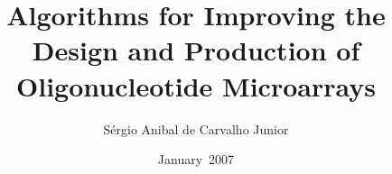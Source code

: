 \documentclass[12pt,pagesize,a4paper,BCOR1cm,DIV13,headsepline,cleardoubleplain,chapterprefix,halfparskip,pointlessnumbers,tablecaptionabove]{scrbook}
\newcommand{\handindate}{January~2007}
\begin{document}
\selectlanguage{\american}
\frontmatter\pagestyle{plain}

\title{Algorithms for Improving the Design and Production of
  Oligonucleotide Microarrays}
\author{S\'ergio Anibal de Carvalho Junior}
\date{\handindate}
\publishers{\large{PhD thesis submitted to the\\
  Faculty of Technology of Bielefeld University, Germany,\\
  for the degree of Dr.~rer.~nat.\\
  ~\\
  Supervisor:\\
  Dr.~Sven Rahmann\\
  }}
\lowertitleback{
  1. Referee: Prof.~Dr.~Jens~Stoye\\
  2. Referee: Prof.~Dr.~Robert~Giegerich\\[2ex]
  }
\maketitle[-1]

\clearpage
\setcounter{tocdepth}{1}



\tableofcontents
\clearpage\pagestyle{headings}
\mainmatter















%
\end{document}
